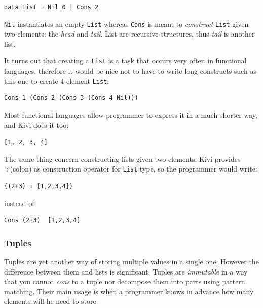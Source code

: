 \documentclass[12pt,a4paper]{report}
\begin{document}
\vspace*{0.2in}
\begin{lstlisting}[style=haskell]
data List = Nil 0 | Cons 2
\end{lstlisting}

\texttt{Nil} instantiates an empty \texttt{List} whereas \texttt{Cons} is meant
to \textit{construct} \texttt{List} given two elements: the \textit{head} and
\textit{tail}. List are recursive structures, thus \textit{tail} is another
list.

It turns out that creating a \texttt{List} is a task that occurs very often in
functional languages, therefore it would be nice not to have to write long
constructs such as this one to create 4-element \texttt{List}:

\vspace*{0.2in}
\begin{lstlisting}[style=haskell]
Cons 1 (Cons 2 (Cons 3 (Cons 4 Nil)))
\end{lstlisting}

Most functional languages allow programmer to express it in a much shorter way,
and Kivi does it too:

\vspace*{0.2in}
\begin{lstlisting}[style=haskell]
[1, 2, 3, 4]
\end{lstlisting}

The same thing concern constructing lists given two elements. Kivi provides
`:`(colon) as construction operator for \texttt{List} type, so the programmer
would write:

\vspace*{0.2in}
\begin{lstlisting}[style=haskell]
((2+3) : [1,2,3,4])
\end{lstlisting}
instead of:

\vspace*{0.2in}
\begin{lstlisting}[style=haskell]
Cons (2+3)  [1,2,3,4]
\end{lstlisting}

\subsubsection{Tuples}
Tuples are yet another way of storing multiple values in a single one. However
the difference between them and lists is significant. Tuples are
\textit{immutable} in a way that you cannot \textit{cons} to a tuple nor
decompose them into parts using pattern matching. Their main usage is when a
programmer knows in advance how many elements will he need to store.
\end{document}
